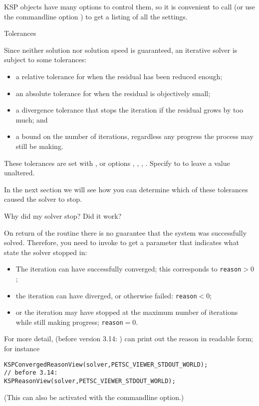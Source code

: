 KSP objects have many options to control them, so it is convenient
to call 
(or use the commandline option )
to get a listing of all the settings.

 {Tolerances}

Since neither
solution nor solution speed is guaranteed, an iterative solver is
subject to some tolerances:
\begin{itemize}
\item a relative tolerance for when the residual has been reduced
  enough;
\item an absolute tolerance for when the residual is objectively
  small;
\item a divergence tolerance that stops the iteration if the residual
  grows by too much; and
\item a bound on the number of iterations, regardless any progress the
  process may still be making.
\end{itemize}

These tolerances are set with ,
or options , ,
, .
Specify to  to leave a value unaltered.

In the next section we will see how you can determine which of these tolerances
caused the solver to stop.

 {Why did my solver stop? Did it work?}
\label{sec:ksp-reason}

On return of the  routine there is no guarantee
that the system was successfully solved.
Therefore, you need to invoke
to get a  parameter that indicates
what state the solver stopped in:
\begin{itemize}
\item The iteration can have successfully converged; this corresponds
  to \lstinline{reason}$>0$;
\item the iteration can have diverged, or otherwise failed: \lstinline{reason}$<0$;
\item or the iteration may have stopped at the maximum number of
  iterations while still making progress; \lstinline{reason}$=0$.
\end{itemize}
For more detail,
(before version 3.14: )
can print out the
reason in readable form; for instance
\begin{lstlisting}
KSPConvergedReasonView(solver,PETSC_VIEWER_STDOUT_WORLD);
// before 3.14:
KSPReasonView(solver,PETSC_VIEWER_STDOUT_WORLD);
\end{lstlisting}
(This can also be activated with the 
commandline option.)

